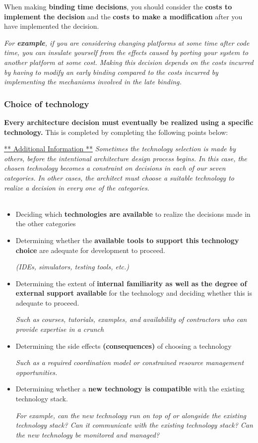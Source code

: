 \documentclass[a4paper]{article}
\begin{document}
When making \textbf{binding time decisions}, you should consider the \textbf{costs to implement the decision} and the \textbf{costs to make a modification} after you have implemented the decision. 

\textit{For \textbf{example}, if you are considering changing platforms at some time after code time, you can insulate yourself from the effects caused by porting your system to another platform at some cost. Making this decision depends on the costs incurred by having to modify an early binding compared to the costs incurred by implementing the mechanisms involved in the late binding.}

\subsubsection{Choice of technology}

\textbf{Every architecture decision must eventually be realized using a specific technology.} This is completed by completing the following points below:

\underline{** Additional Information **}
\textit{Sometimes the technology selection is made by others, before the intentional architecture design process begins. In this case, the chosen technology becomes a constraint on decisions in each of our seven categories. In other cases, the architect must choose a suitable technology to realize a decision in every one of the categories.}\\\\

\begin{itemize}
\item Deciding which \textbf{technologies are available} to realize the decisions made in the other categories

\item Determining whether the \textbf{available tools to support this technology choice} are adequate for development to proceed.

\textit{(IDEs, simulators, testing tools, etc.)}

\item Determining the extent of \textbf{internal familiarity as well as the degree of external support available} for the technology and deciding whether this is adequate to proceed.

\textit{Such as courses, tutorials, examples, and availability of contractors who can provide expertise in a crunch}

\item Determining the side effects \textbf{(consequences)} of choosing a technology

\textit{Such as a required coordination model or constrained resource management opportunities.}

\item Determining whether a \textbf{new technology is compatible} with the existing technology stack. 

\textit{For example, can the new technology run on top of or alongside the existing technology stack? Can it communicate with the existing technology stack? Can the new technology be monitored and managed?}
\end{itemize}
\newpage
\end{document}
